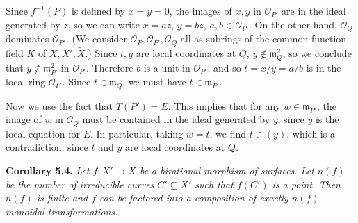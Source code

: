 {Since $f^{-1}(P)$ is defined by $x=y=0$, the images of $x,y$ in $\mathcal O_{P'}$ are in the ideal generated by $z$, so we can write $x=az$, $y=bz$, $a,b\in\mathcal O_{P'}$. On the other hand, $\mathcal O_Q$ dominates $\mathcal O_{P'}$. (We consider $\mathcal O_P,\mathcal O_{P'},\mathcal O_Q$ all as subrings of the common function field $K$ of $X,X',\widetilde X$.) Since $t,y$ are local coordinates at $Q$, $y\notin\mathfrak m_Q^2$, so we conclude that $y\notin\mathfrak m_{P'}^2$ in $\mathcal O_{P'}$. Therefore $b$ is a unit in $\mathcal O_{P'}$, and so $t=x/y=a/b$ is in the local ring $\mathcal O_{P'}$. Since $t\in\mathfrak m_Q$, we must have $t\in\mathfrak m_{P'}$.

Now we use the fact that $T(P')=E$. This implies that for any $w\in\mathfrak m_{P'}$, the image of $w$ in $\mathcal O_Q$ must be contained in the ideal generated by $y$, since $y$ is the local equation for $E$. In particular, taking $w=t$, we find $t\in(y)$, which is a contradiction, since $t$ and $y$ are local coordinates at $Q$.

\medskip
\noindent\hypertarget{result-V-5.4}{}\textbf{Corollary 5.4.} \emph{Let $f\colon X'\to X$ be a birational morphism of surfaces. Let $n(f)$ be the number of irreducible curves $C'\subseteq X'$ such that $f(C')$ is a point. Then $n(f)$ is finite and $f$ can be factored into a composition of exactly $n(f)$ monoidal transformations.}}
